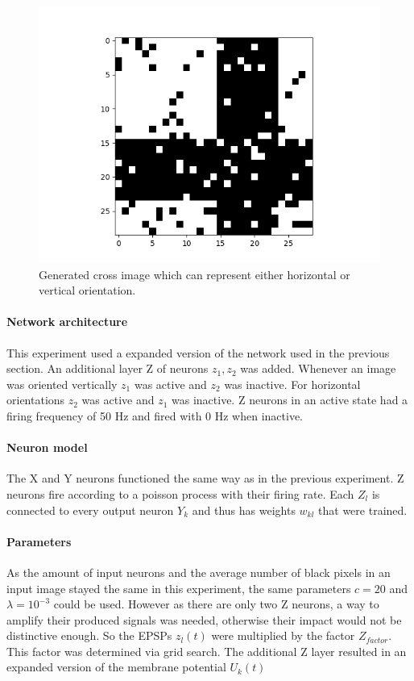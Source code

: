 \begin{figure}
  \includegraphics[width=0.6\linewidth]{figures/horvert/horvertTrainingCrossImage.png}
  \caption{Generated cross image which can represent either horizontal or vertical orientation.}
  \label{fig:horvertTrainingCrossImage}
\end{figure}


\paragraph{Network architecture}

This experiment used a expanded version of the network used in the previous section. An additional layer Z of neurons $z_1,z_2$ was added. Whenever an image was oriented vertically $z_1$ was active and $z_2$ was inactive. For horizontal orientations $z_2$ was active and $z_1$ was inactive. Z neurons in an active state had a firing frequency of 50 Hz and fired with 0 Hz when inactive.

\paragraph{Neuron model}
The X and Y neurons functioned the same way as in the previous experiment. Z neurons fire according to a poisson process with their firing rate. Each $Z_l$ is connected to every output neuron $Y_k$ and thus has weights $w_{kl}$ that were trained. 

\paragraph{Parameters}
As the amount of input neurons and the average number of black pixels in an input image stayed the same in this experiment, the same parameters $c=  20$ and $\lambda = 10^{-3}$ could be used. However as there are only two Z neurons, a way to amplify their produced signals was needed, otherwise their impact would not be distinctive enough. So the EPSPs $z_l(t)$ were multiplied by the factor $Z_{factor}$. This factor was determined via grid search. The additional Z layer resulted in an expanded version of the membrane potential $U_k(t)$

